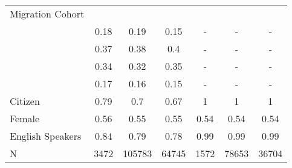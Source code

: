 \begin{table}[ht]
\begin{tabular}{>{\raggedright\arraybackslash}p{3.2cm}|cccccc}
  Migration Cohort &  &  &  &  &  &  \\ 
  \multicolumn{1}{>{\raggedleft\arraybackslash}p{2.3cm}|}{\makebox[2.3cm][r]{Before 1965 }}& 0.18 & 0.19 & 0.15 & - & - & - \\ 
  \multicolumn{1}{>{\raggedleft\arraybackslash}p{2.2cm}|}{\makebox[2.2cm][r]{1965 - 1979 }}& 0.37 & 0.38 & 0.4 & - & - & - \\ 
  \multicolumn{1}{>{\raggedleft\arraybackslash}p{2.2cm}|}{\makebox[2.2cm][r]{1980 - 1999 }}& 0.34 & 0.32 & 0.35 & - & - & - \\ 
  \multicolumn{1}{>{\raggedleft\arraybackslash}p{2.1cm}|}{\makebox[2.1cm][r]{After 2000 }}& 0.17 & 0.16 & 0.15 & - & - & - \\ 
  Citizen & 0.79 & 0.7 & 0.67 & 1 & 1 & 1 \\ 
  Female & 0.56 & 0.55 & 0.55 & 0.54 & 0.54 & 0.54 \\ 
  English Speakers & 0.84 & 0.79 & 0.78 & 0.99 & 0.99 & 0.99 \\ 
  N & 3472 & 105783 & 64745 & 1572 & 78653 & 36704 \\ 
   \hline
\end{tabular}
\endgroup
\end{table}
